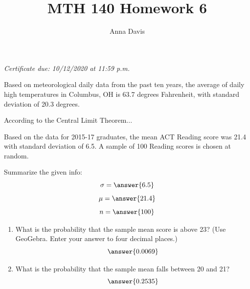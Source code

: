 \documentclass{ximera}
\author{Anna Davis} \title{MTH 140 Homework 6}
\begin{document}
\begin{abstract}

\end{abstract}
\maketitle
 \textit{Certificate due: 10/12/2020 at 11:59 p.m.}
 
 \begin{problem}\label{prob:140hom6prob1}
 Based on meteorological daily data from the past ten years, the average of daily high temperatures in Columbus, OH is 63.7 degrees Fahrenheit, with standard deviation of 20.3 degrees. 
 
 According to the Central Limit Theorem...
     \begin{multipleChoice}  
\end{multipleChoice}

 \end{problem}
 
 \begin{problem}\label{prob:140hom6prob2}
 Based on the data for 2015-17 graduates, the mean ACT Reading score was 21.4 with standard deviation of 6.5.  A sample of 100 Reading scores is chosen at random. 
 
 Summarize the given info:
$$\sigma=\answer{6.5}$$
$$\mu=\answer{21.4}$$
$$n=\answer{100}$$

\begin{center}  
\end{center}
\begin{enumerate}
\item
What is the probability that the sample mean score is above 23?  (Use GeoGebra.  Enter your answer to four decimal places.)
$$\answer{0.0069}$$
\item What is the probability that the sample mean falls between 20 and 21?
$$\answer{0.2535}$$
\end{enumerate}
\end{problem}
\end{document}
